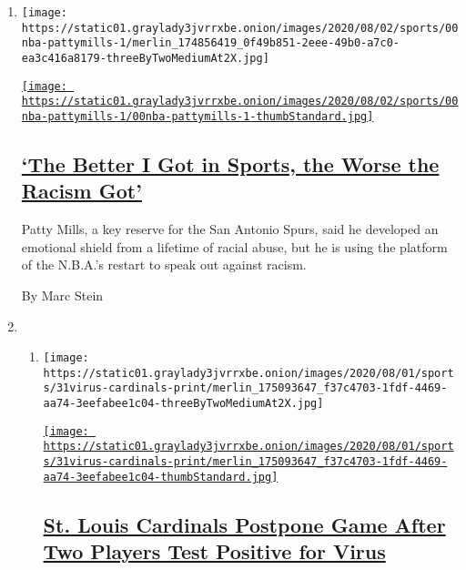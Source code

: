 \begin{enumerate}
\def\labelenumi{\arabic{enumi}.}
\item
  \texttt{[image: https://static01.graylady3jvrrxbe.onion/images/2020/08/02/sports/00nba-pattymills-1/merlin\_174856419\_0f49b851-2eee-49b0-a7c0-ea3c416a8179-threeByTwoMediumAt2X.jpg]}

  \href{/2020/07/31/sports/basketball/spurs-patty-mills.html}{\texttt{[image: https://static01.graylady3jvrrxbe.onion/images/2020/08/02/sports/00nba-pattymills-1/00nba-pattymills-1-thumbStandard.jpg]}}

  \hypertarget{the-better-i-got-in-sports-the-worse-the-racism-got}{%
  \subsection{\texorpdfstring{\href{/2020/07/31/sports/basketball/spurs-patty-mills.html}{`The
  Better I Got in Sports, the Worse the Racism
  Got'}}{`The Better I Got in Sports, the Worse the Racism Got'}}\label{the-better-i-got-in-sports-the-worse-the-racism-got}}

  Patty Mills, a key reserve for the San Antonio Spurs, said he
  developed an emotional shield from a lifetime of racial abuse, but he
  is using the platform of the N.B.A.'s restart to speak out against
  racism.

  By Marc Stein
\item
  \begin{enumerate}
  \def\labelenumii{\arabic{enumii}.}
  \item
    \texttt{[image: https://static01.graylady3jvrrxbe.onion/images/2020/08/01/sports/31virus-cardinals-print/merlin\_175093647\_f37c4703-1fdf-4469-aa74-3eefabee1c04-threeByTwoMediumAt2X.jpg]}

    \href{/2020/07/31/sports/baseball/cardinals-twins-coronavirus-mlb.html}{\texttt{[image: https://static01.graylady3jvrrxbe.onion/images/2020/08/01/sports/31virus-cardinals-print/merlin\_175093647\_f37c4703-1fdf-4469-aa74-3eefabee1c04-thumbStandard.jpg]}}

    \hypertarget{st-louis-cardinals-postpone-game-after-two-players-test-positive-for-virus}{%
    \subsection{\texorpdfstring{\href{/2020/07/31/sports/baseball/cardinals-twins-coronavirus-mlb.html}{St.
    Louis Cardinals Postpone Game After Two Players Test Positive for
    Virus}}{St. Louis Cardinals Postpone Game After Two Players Test Positive for Virus}}\label{st-louis-cardinals-postpone-game-after-two-players-test-positive-for-virus}}


\end{enumerate}
\end{enumerate}

